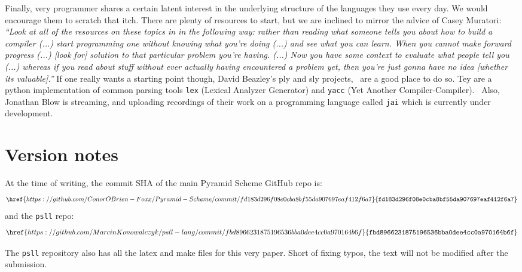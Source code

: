 \documentclass[aip,jcp,reprint,footinbib]{revtex4-1}
\let\tt\texttt
\newcommand\psll{\texttt{psll}\xspace}
\begin{document}
Finally, very programmer shares a certain latent interest in the underlying structure of the languages they use every day. We would encourage them to scratch that itch. There are plenty of resources to start, but we are inclined to mirror the advice of Casey Muratori:~\cite{blow2020qna} \textit{\enquote{Look at all of the resources on these topics in in the following way: rather than reading what someone tells you about how to build a compiler (...) start programming one without knowing what you're doing (...) and see what you can learn. When you cannot make forward progress (...) [look for] solution to that particular problem you're having. (...) Now you have some context to evaluate what people tell you (...) whereas if you read about stuff without ever actually having encountered a problem yet, then you're just gonna have no idea [whether its valuable].}} If one really wants a starting point though, David Beazley's ply and sly projects,~\cite{dbeaz2018,sly,ply} are a good place to do so. Tey are a python implementation of common parsing tools \tt{lex} (Lexical Analyzer Generator) and \tt{yacc} (Yet Another Compiler-Compiler).~\cite{levine1992} Also, Jonathan Blow is streaming, and uploading recordings of their work on a programming language called \tt{jai} which is currently under development.~\cite{blow2020}

\section*{Version notes}

\setlength{\abovedisplayskip}{3pt}
\setlength{\belowdisplayskip}{3pt}

At the time of writing, the commit SHA of the main Pyramid Scheme GitHub repo is:~\cite{pyra_git} 
\[
    \href{https://github.com/ConorOBrien-Foxx/Pyramid-Scheme/commit/fd183d296f08e0cba8bf55da907697eaf412f6a7}{\tt{fd183d296f08e0cba8bf55da907697eaf412f6a7}}
\]
and the \psll repo:~\cite{psll_git}
\[
    \href{https://github.com/MarcinKonowalczyk/psll-lang/commit/fbd8966231875196536bba0dee4cc0a970164b6f}{\tt{fbd8966231875196536bba0dee4cc0a970164b6f}}
\]

The \psll repository also has all the latex and make files for this very paper. Short of fixing typos, the text will not be modified after the submission.
\end{document}
